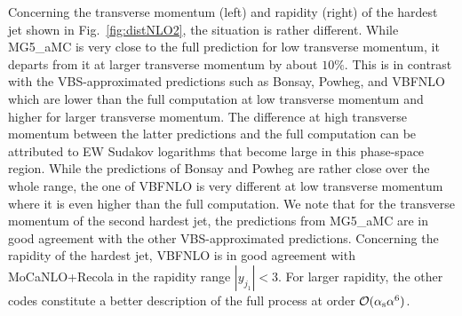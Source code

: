 \documentclass[twocolumn,epjc3]{svjour3} %
\begin{document}
    Concerning the transverse momentum (left) and rapidity (right) of the hardest jet shown in Fig.~\ref{fig:distNLO2}, the situation is rather different.
    While {\sc MG5\_aMC} is very close to the full prediction for low transverse momentum, it departs from it 
    at larger transverse momentum by about $10\%$.
    This is in contrast with the VBS-approximated predictions such as {\sc Bonsay}, {\sc Powheg}, and {\sc VBFNLO} which are lower than the full computation at low transverse momentum and higher for larger transverse momentum.
    The difference at high transverse momentum between the latter predictions and the full computation can be attributed to EW Sudakov logarithms that become large in this phase-space region.
    While the predictions of {\sc Bonsay} and {\sc Powheg} are rather close over the whole range, the one of {\sc VBFNLO} is very different at low transverse momentum where it is even higher than the full computation.
    We note that for the transverse momentum of the second hardest jet, the predictions from {\sc MG5\_aMC} are in good agreement with the other VBS-approximated predictions.
    Concerning the rapidity of the hardest jet, {\sc VBFNLO} is in good agreement with {\sc MoCaNLO}+{\sc Recola} in the rapidity range $|y_{j_1}| < 3$.
    For larger rapidity, the other codes constitute a better description of the full process at order $\mathcal{O}(\alpha_{\rm s}\alpha^6)$.
\end{document}
